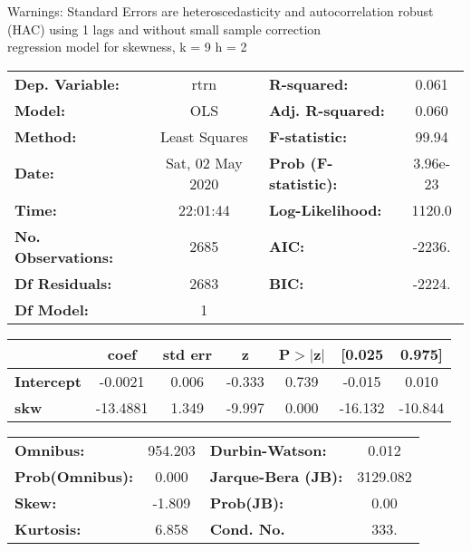 Warnings: \newline
 [1] Standard Errors are heteroscedasticity and autocorrelation robust (HAC) using 1 lags and without small sample correction\\ 

regression model for skewness, k = 9 h = 2\begin{center}
\begin{tabular}{lclc}
\toprule
\textbf{Dep. Variable:}    &       rtrn       & \textbf{  R-squared:         } &     0.061   \\
\textbf{Model:}            &       OLS        & \textbf{  Adj. R-squared:    } &     0.060   \\
\textbf{Method:}           &  Least Squares   & \textbf{  F-statistic:       } &     99.94   \\
\textbf{Date:}             & Sat, 02 May 2020 & \textbf{  Prob (F-statistic):} &  3.96e-23   \\
\textbf{Time:}             &     22:01:44     & \textbf{  Log-Likelihood:    } &    1120.0   \\
\textbf{No. Observations:} &        2685      & \textbf{  AIC:               } &    -2236.   \\
\textbf{Df Residuals:}     &        2683      & \textbf{  BIC:               } &    -2224.   \\
\textbf{Df Model:}         &           1      & \textbf{                     } &             \\
\bottomrule
\end{tabular}
\begin{tabular}{lcccccc}
                   & \textbf{coef} & \textbf{std err} & \textbf{z} & \textbf{P$> |$z$|$} & \textbf{[0.025} & \textbf{0.975]}  \\
\midrule
\textbf{Intercept} &      -0.0021  &        0.006     &    -0.333  &         0.739        &       -0.015    &        0.010     \\
\textbf{skw}       &     -13.4881  &        1.349     &    -9.997  &         0.000        &      -16.132    &      -10.844     \\
\bottomrule
\end{tabular}
\begin{tabular}{lclc}
\textbf{Omnibus:}       & 954.203 & \textbf{  Durbin-Watson:     } &    0.012  \\
\textbf{Prob(Omnibus):} &   0.000 & \textbf{  Jarque-Bera (JB):  } & 3129.082  \\
\textbf{Skew:}          &  -1.809 & \textbf{  Prob(JB):          } &     0.00  \\
\textbf{Kurtosis:}      &   6.858 & \textbf{  Cond. No.          } &     333.  \\
\bottomrule
\end{tabular}
\end{center}


